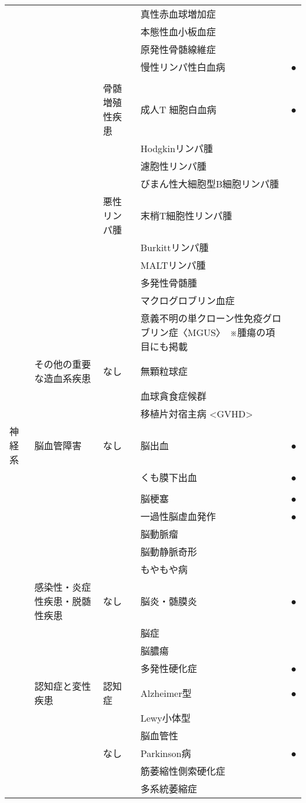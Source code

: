 \begin{xltabular}{\linewidth}{XXXXX}
 &  &  & 真性赤血球増加症 &  \\
 &  &  & 本態性血小板血症 &  \\
 &  &  & 原発性骨髄線維症 &  \\
 &  &  & 慢性リンパ性白血病 & ● \\
 &  &  &  &  \\
 &  & 骨髄増殖性疾患 & 成人T 細胞白血病 & ● \\
 &  &  & Hodgkinリンパ腫 &  \\
 &  &  & 濾胞性リンパ腫 &  \\
 &  &  & びまん性大細胞型B細胞リンパ腫 &  \\
 &  & 悪性リンパ腫 & 末梢T細胞性リンパ腫 &  \\
 &  &  & Burkittリンパ腫 &  \\
 &  &  & MALTリンパ腫 &  \\
 &  &  & 多発性骨髄腫 &  \\
 &  &  & マクログロブリン血症 &  \\
 &  &  & 意義不明の単クローン性免疫グロブリン症〈MGUS〉　※腫瘍の項目にも掲載 &  \\
 & その他の重要な造血系疾患 & なし & 無顆粒球症 &  \\
 &  &  & 血球貪食症候群 &  \\
 &  &  & 移植片対宿主病 <GVHD> &  \\
神経系 & 脳血管障害 & なし & 脳出血 & ● \\
 &  &  & くも膜下出血 & ● \\
 &  &  &  &  \\
 &  &  & 脳梗塞 & ● \\
 &  &  & 一過性脳虚血発作 & ● \\
 &  &  & 脳動脈瘤 &  \\
 &  &  & 脳動静脈奇形 &  \\
 &  &  & もやもや病 &  \\
 & 感染性・炎症性疾患・脱髄性疾患 & なし & 脳炎・髄膜炎 & ● \\
 &  &  & 脳症 &  \\
 &  &  & 脳膿瘍 &  \\
 &  &  & 多発性硬化症 & ● \\
 & 認知症と変性疾患 & 認知症 & Alzheimer型 & ● \\
 &  &  & Lewy小体型 &  \\
 &  &  & 脳血管性 &  \\
 &  & なし & Parkinson病 & ● \\
 &  &  & 筋萎縮性側索硬化症 &  \\
 &  &  & 多系統萎縮症 &  \\

\end{xltabular}
